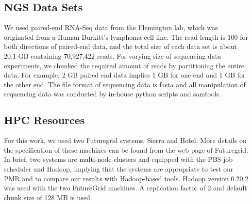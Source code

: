 \documentclass{acm_proc_article-sp}
\begin{document}
\subsection{NGS Data Sets}
We used paired-end RNA-Seq data from the Flemington lab, which was originated from a Human Burkitt's lymphoma cell line\cite{erik_2010}. The read length is 100 for both directions of paired-end data, and the total size of each data set is about 20.1 GB containing 70,927,422 reads.  For varying size of sequencing data experiments, we chunked the required amount of reads by partitioning the entire data.  For example, 2 GB paired end data implies 1 GB for one end and 1 GB for the other end.  The file format of sequencing data is fasta and all manipulation of sequencing data was conducted by in-house python scripts and samtools\cite{samtools}.  

\subsection{HPC Resources}
For this work, we used two Futuregrid systems, Sierra and Hotel.  More details on the specification of these machines can be found from the web page of Futuregrid\cite{futuregrid_url}.  In brief, two systems are multi-node clusters and equipped with the PBS job scheduler and Hadoop, implying that the systems are appropriate to test our PMR and to compare our results with Hadoop-based tools. Hadoop version 0.20.2 was used with the two FutureGrid machines. A replication factor of 2 and default chunk size of 128 MB is used. 
\end{document}
